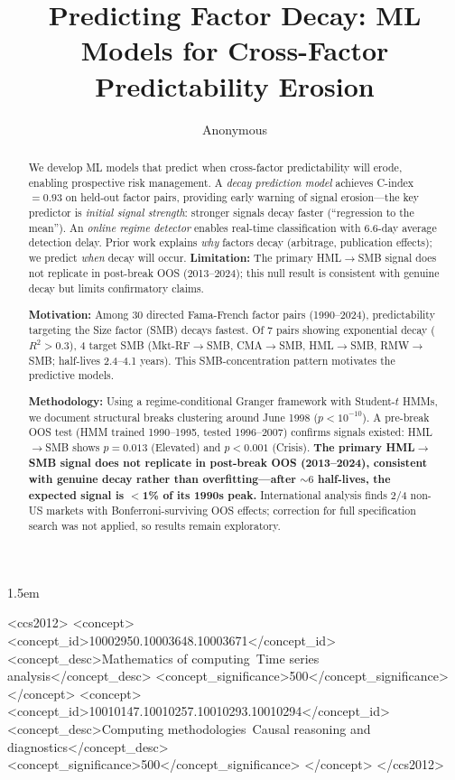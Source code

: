 \documentclass[sigconf,anonymous]{acmart}
\begin{document}
\sloppy
\emergencystretch 1.5em

\title{Predicting Factor Decay: ML Models for Cross-Factor Predictability Erosion}

\author{Anonymous}

\begin{abstract}
We develop ML models that predict when cross-factor predictability will
erode, enabling prospective risk management. A \emph{decay prediction model}
achieves C-index $= 0.93$ on held-out factor pairs, providing early
warning of signal erosion---the key predictor is \emph{initial signal strength}:
stronger signals decay faster (``regression to the mean''). An \emph{online regime detector} enables
real-time classification with 6.6-day average detection delay. Prior
work explains \emph{why} factors decay (arbitrage, publication effects);
we predict \emph{when} decay will occur.
\textbf{Limitation:} The primary HML$\to$SMB signal does not replicate
in post-break OOS (2013--2024); this null result is consistent with
genuine decay but limits confirmatory claims.

\textbf{Motivation:} Among 30 directed Fama-French factor pairs (1990--2024),
predictability targeting the Size factor (SMB) decays fastest. Of 7 pairs
showing exponential decay ($R^2 > 0.3$), 4 target SMB
(Mkt-RF$\to$SMB, CMA$\to$SMB, HML$\to$SMB, RMW$\to$SMB; half-lives 2.4--4.1 years).
This SMB-concentration pattern motivates the predictive models.

\textbf{Methodology:} Using a regime-conditional Granger framework with
Student-$t$ HMMs, we document structural breaks clustering around June 1998
($p < 10^{-10}$). A pre-break OOS test (HMM trained 1990--1995, tested
1996--2007) confirms signals existed: HML$\to$SMB shows $p = 0.013$ (Elevated)
and $p < 0.001$ (Crisis). \textbf{The primary HML$\to$SMB signal does not
replicate in post-break OOS (2013--2024), consistent with genuine decay
rather than overfitting---after ${\sim}6$ half-lives, the expected signal
is $<$1\% of its 1990s peak.} International analysis finds
2/4 non-US markets with Bonferroni-surviving OOS effects; correction for
full specification search was not applied, so results remain exploratory.
\end{abstract}

\begin{CCSXML}
<ccs2012>
   <concept>
       <concept_id>10002950.10003648.10003671</concept_id>
       <concept_desc>Mathematics of computing~Time series analysis</concept_desc>
       <concept_significance>500</concept_significance>
   </concept>
   <concept>
       <concept_id>10010147.10010257.10010293.10010294</concept_id>
       <concept_desc>Computing methodologies~Causal reasoning and diagnostics</concept_desc>
       <concept_significance>500</concept_significance>
   </concept>
</ccs2012>
\end{CCSXML}
\end{document}

